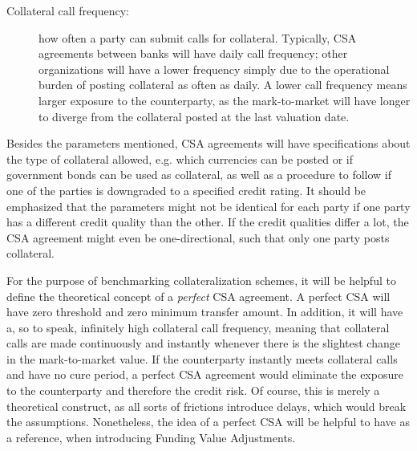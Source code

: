 \documentclass[main.tex]{subfiles}
\begin{document}
\begin{description}
            \item[Collateral call frequency:]
            how often a party can submit calls for collateral.
            Typically, CSA agreements between banks will have daily call frequency;
            other organizations will have a lower frequency simply due to the operational burden
            of posting collateral as often as daily. 
            A lower call frequency means larger exposure to the counterparty,
            as the mark-to-market will have longer to diverge from the collateral posted 
            at the last valuation date.
        \end{description}

        Besides the parameters mentioned, CSA agreements will have specifications about the type of collateral allowed,
        e.g. which currencies can be posted or if government bonds can be used as collateral,
        as well as a procedure to follow if one of the parties is downgraded to a specified credit rating.
        It should be emphasized that the parameters might not be identical for each party
        if one party has a different credit quality than the other.
        If the credit qualities differ a lot, the CSA agreement might even be one-directional,
        such that only one party posts collateral.

        For the purpose of benchmarking collateralization schemes, 
        it will be helpful to define the theoretical concept of a \textit{perfect} CSA agreement.
        A perfect CSA will have zero threshold and zero minimum transfer amount.
        In addition, it will have a, so to speak, infinitely high collateral call frequency,
        meaning that collateral calls are made continuously and instantly 
        whenever there is the slightest change in the mark-to-market value. 
        If the counterparty instantly meets collateral calls and have no cure period,
        a perfect CSA agreement would eliminate the exposure to the counterparty
        and therefore the credit risk.
        Of course, this is merely a theoretical construct, as all sorts of frictions introduce delays,
        which would break the assumptions.
        Nonetheless, the idea of a perfect CSA will be helpful to have as a reference,
        when introducing Funding Value Adjustments.
\end{document}
